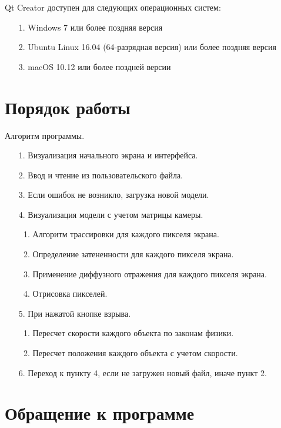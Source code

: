 Qt Creator доступен для следующих операционных систем:

\begin{enumerate}
	\item[1. ]Windows 7 или более поздняя версия
	\item[2. ]Ubuntu Linux 16.04 (64-разрядная версия) или более поздняя версия
	\item[3. ]macOS 10.12 или более поздней версии
\end{enumerate}

\section{\textbf{Порядок работы }}

Алгоритм программы. 

\begin{enumerate}
	\item[1. ] Визуализация начального экрана и интерфейса. 
	\item[2. ] Ввод и чтение из пользовательского файла. 
	\item[3. ] Если ошибок не возникло, загрузка новой модели. 
	\item[4. ] Визуализация модели с учетом матрицы камеры. 
	\begin{enumerate}
		\item Алгоритм трассировки для каждого пикселя экрана. 
		\item Определение затененности для каждого пикселя экрана. 
		\item Применение диффузного отражения для каждого пикселя экрана. 
		\item Отрисовка пикселей. 
	\end{enumerate}
	\item[5. ] При нажатой кнопке взрыва. 
	\begin{enumerate}
		\item Пересчет скорости каждого объекта по законам физики. 
		\item Пересчет положения каждого объекта с учетом скорости. 
	\end{enumerate}
	\item[6. ] Переход к пункту 4, если не загружен новый файл, иначе пункт 2. 
\end{enumerate}

\section{\textbf{Обращение к программе }}

